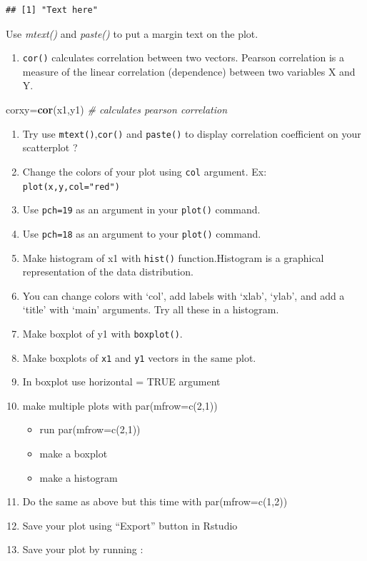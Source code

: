 \documentclass[12pt,]{krantz}
\newenvironment{Shaded}{\begin{snugshade}}{\end{snugshade}}
\newcommand{\CommentTok}[1]{\textcolor[rgb]{0.56,0.35,0.01}{\textit{#1}}}
\newcommand{\KeywordTok}[1]{\textcolor[rgb]{0.13,0.29,0.53}{\textbf{#1}}}
\newcommand{\NormalTok}[1]{#1}
\providecommand{\tightlist}{%
  \setlength{\itemsep}{0pt}\setlength{\parskip}{0pt}}
\theoremstyle{definition}
\theoremstyle{definition}
\theoremstyle{definition}
\theoremstyle{remark}
\begin{document}
\begin{verbatim}
## [1] "Text here"
\end{verbatim}

Use \emph{mtext()} and \emph{paste()} to put a margin text on the plot.

\begin{enumerate}
\def\labelenumi{\arabic{enumi}.}
\setcounter{enumi}{43}
\tightlist
\item
  \texttt{cor()} calculates correlation between two vectors. Pearson
  correlation is a measure of the linear correlation (dependence)
  between two variables X and Y.
\end{enumerate}

\begin{Shaded}
\begin{Highlighting}[]
\NormalTok{corxy=}\KeywordTok{cor}\NormalTok{(x1,y1) }\CommentTok{# calculates pearson correlation}
\end{Highlighting}
\end{Shaded}

\begin{enumerate}
\def\labelenumi{\arabic{enumi}.}
\setcounter{enumi}{43}
\item
  Try use \texttt{mtext()},\texttt{cor()} and \texttt{paste()} to
  display correlation coefficient on your scatterplot ?
\item
  Change the colors of your plot using \texttt{col} argument. Ex:
  \texttt{plot(x,y,col="red")}
\item
  Use \texttt{pch=19} as an argument in your \texttt{plot()} command.
\item
  Use \texttt{pch=18} as an argument to your \texttt{plot()} command.
\item
  Make histogram of x1 with \texttt{hist()} function.Histogram is a
  graphical representation of the data distribution.
\item
  You can change colors with `col', add labels with `xlab', `ylab', and
  add a `title' with `main' arguments. Try all these in a histogram.
\item
  Make boxplot of y1 with \texttt{boxplot()}.
\item
  Make boxplots of \texttt{x1} and \texttt{y1} vectors in the same plot.
\item
  In boxplot use horizontal = TRUE argument
\item
  make multiple plots with par(mfrow=c(2,1))

  \begin{itemize}
  \tightlist
  \item
    run par(mfrow=c(2,1))
  \item
    make a boxplot
  \item
    make a histogram
  \end{itemize}
\item
  Do the same as above but this time with par(mfrow=c(1,2))
\item
  Save your plot using ``Export'' button in Rstudio
\item
  Save your plot by running :
\end{enumerate}
\end{document}
